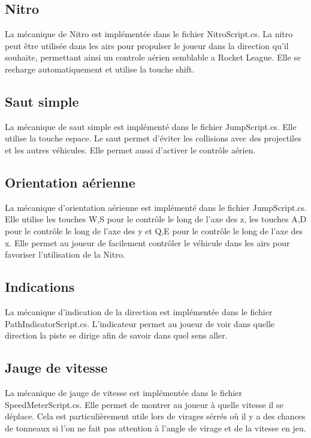 \documentclass[a4paper, 12pt]{article} %
\begin{document}
\subsection{Nitro}
La mécanique de Nitro est implémentée dans le fichier NitroScript.cs. La nitro peut être utilisée dans les airs pour propulser le joueur dans la direction qu'il souhaite, permettant ainsi un controle aérien semblable a Rocket League. Elle se recharge automatiquement et utilise la touche shift.
\subsection{Saut simple}
La mécanique de saut simple est implémenté dans le fichier JumpScript.cs. Elle utilise la touche espace. Le saut permet d'éviter les collisions avec des projectiles et les autres véhicules. Elle permet aussi d'activer le contrôle aérien.
\subsection{Orientation aérienne}
La mécanique d'orientation aérienne est implémenté dans le fichier JumpScript.cs. Elle utilise les touches W,S pour le contrôle le long de l'axe des z, les touches A,D pour le contrôle le long de l'axe des y et Q,E pour le contrôle le long de l'axe des x. Elle permet au joueur de facilement contrôler le véhicule dans les airs pour favoriser l'utilisation de la Nitro.
\subsection{Indications}
La mécanique d'indication de la direction est implémentée dans le fichier PathIndicatorScript.cs. L'indicateur permet au joueur de voir dans quelle direction la piste se dirige afin de savoir dans quel sens aller.
\subsection{Jauge de vitesse}
La mécanique de jauge de vitesse est implémentée dans le fichier SpeedMeterScript.cs. Elle permet de montrer au joueur à quelle vitesse il se déplace. Cela est particulièrement utile lors de virages sérrés où il y a des chances de tonneaux si l'on ne fait pas attention à l'angle de virage et de la vitesse en jeu.

\vspace{10pt}
\end{document}
